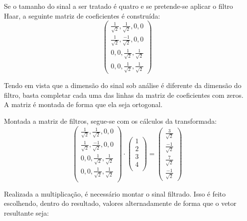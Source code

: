 			\par Se o tamanho do sinal a ser tratado é quatro e se pretende-se aplicar o filtro Haar, a seguinte matriz de coeficientes é construída:
			\begin{equation}
				\begin{pmatrix}
					\frac{1}{\sqrt{2}}, \frac{1}{\sqrt{2}}, 0, 0\\
					\frac{1}{\sqrt{2}}, \frac{-1}{\sqrt{2}}, 0, 0\\
					0, 0, \frac{1}{\sqrt{2}}, \frac{1}{\sqrt{2}}\\
					0, 0, \frac{1}{\sqrt{2}}, \frac{1}{\sqrt{2}}
					\label{eq:haarFilters}
				\end{pmatrix} 
			\end{equation}
			\par Tendo em vista que a dimensão do sinal sob análise é diferente da dimensão do filtro, basta completar cada uma das linhas da matriz de coeficientes com zeros. A matriz é montada de forma que ela seja ortogonal.

			\par Montada a matriz de filtros, segue-se com os cálculos da transformada:
			\begin{equation}
				\begin{pmatrix}
					\frac{1}{\sqrt{2}}, \frac{1}{\sqrt{2}}, 0, 0\\
					\frac{1}{\sqrt{2}}, \frac{-1}{\sqrt{2}}, 0, 0\\
					0, 0, \frac{1}{\sqrt{2}}, \frac{1}{\sqrt{2}}\\
					0, 0, \frac{1}{\sqrt{2}}, \frac{1}{\sqrt{2}}\\
				\end{pmatrix} 
				\cdot
				\begin{pmatrix}
					1\\
					2\\
					3\\
					4\\
				\end{pmatrix} 
				=
				\begin{pmatrix}
					\frac{3}{\sqrt{2}}\\
					\frac{-1}{\sqrt{2}}\\
					\frac{7}{\sqrt{2}}\\
					\frac{-1}{\sqrt{2}}
				\end{pmatrix}
				\label{eq:haarMultiplic}
			\end{equation}
			
			\par Realizada a multiplicação, é necessário montar o sinal filtrado. Isso é feito escolhendo, dentro do resultado, valores alternadamente de forma que o vetor resultante seja:

